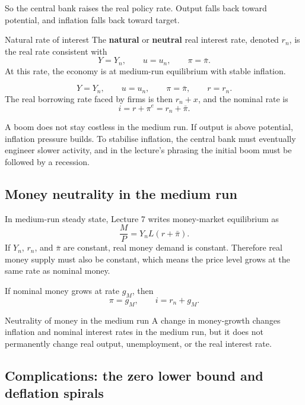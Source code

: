\documentclass[12pt]{article}
\begin{document}
So the central bank raises the real policy rate. Output falls back toward potential, and inflation falls back toward target.

\begin{definition}{Natural rate of interest}{}
The \textbf{natural} or \textbf{neutral} real interest rate, denoted $r_n$, is the real rate consistent with
\[
Y=Y_n,\qquad u=u_n,\qquad \pi=\bar{\pi}.
\]
At this rate, the economy is at medium-run equilibrium with stable inflation.
\end{definition}

\newpage
\begin{keyformula}[title={Key Formula: Medium-run equilibrium}]
\[
Y=Y_n,\qquad u=u_n,\qquad \pi=\bar{\pi},\qquad r=r_n.
\]
The real borrowing rate faced by firms is then $r_n+x$, and the nominal rate is
\[
i=r+\pi^e=r_n+\bar{\pi}.
\]
\end{keyformula}

\begin{policynote}
A boom does not stay costless in the medium run. If output is above potential, inflation pressure builds. To stabilise inflation, the central bank must eventually engineer slower activity, and in the lecture's phrasing the initial boom must be followed by a recession.
\end{policynote}

\subsection{Money neutrality in the medium run}

In medium-run steady state, Lecture 7 writes money-market equilibrium as
\[
\frac{M}{P}=Y_nL(r+\bar{\pi}).
\]
If $Y_n$, $r_n$, and $\bar{\pi}$ are constant, real money demand is constant. Therefore real money supply must also be constant, which means the price level grows at the same rate as nominal money.

If nominal money grows at rate $g_M$, then
\[
\pi=g_M,\qquad i=r_n+g_M.
\]

\begin{theorem}{Neutrality of money in the medium run}{}
A change in money-growth changes inflation and nominal interest rates in the medium run, but it does not permanently change real output, unemployment, or the real interest rate.
\end{theorem}

\subsection{Complications: the zero lower bound and deflation spirals}
\end{document}

